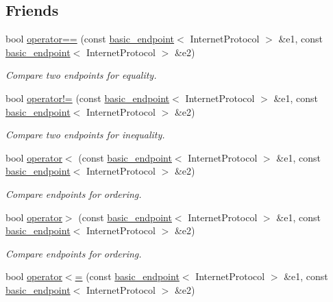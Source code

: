 \subsection*{Friends}
\begin{DoxyCompactItemize}
\item 
bool \hyperlink{classasio_1_1ip_1_1basic__endpoint_ac1430c7f3347469bf9693d0ad95d3bef}{operator==} (const \hyperlink{classasio_1_1ip_1_1basic__endpoint}{basic\+\_\+endpoint}$<$ Internet\+Protocol $>$ \&e1, const \hyperlink{classasio_1_1ip_1_1basic__endpoint}{basic\+\_\+endpoint}$<$ Internet\+Protocol $>$ \&e2)
\begin{DoxyCompactList}\small\item\em Compare two endpoints for equality. \end{DoxyCompactList}\item 
bool \hyperlink{classasio_1_1ip_1_1basic__endpoint_a5073cdcedcb2557a1c2cebba50672bb1}{operator!=} (const \hyperlink{classasio_1_1ip_1_1basic__endpoint}{basic\+\_\+endpoint}$<$ Internet\+Protocol $>$ \&e1, const \hyperlink{classasio_1_1ip_1_1basic__endpoint}{basic\+\_\+endpoint}$<$ Internet\+Protocol $>$ \&e2)
\begin{DoxyCompactList}\small\item\em Compare two endpoints for inequality. \end{DoxyCompactList}\item 
bool \hyperlink{classasio_1_1ip_1_1basic__endpoint_a244f754ee6c5338902d0825785298cf9}{operator$<$} (const \hyperlink{classasio_1_1ip_1_1basic__endpoint}{basic\+\_\+endpoint}$<$ Internet\+Protocol $>$ \&e1, const \hyperlink{classasio_1_1ip_1_1basic__endpoint}{basic\+\_\+endpoint}$<$ Internet\+Protocol $>$ \&e2)
\begin{DoxyCompactList}\small\item\em Compare endpoints for ordering. \end{DoxyCompactList}\item 
bool \hyperlink{classasio_1_1ip_1_1basic__endpoint_a4386f95d228ee98c40d8720288d1fa69}{operator$>$} (const \hyperlink{classasio_1_1ip_1_1basic__endpoint}{basic\+\_\+endpoint}$<$ Internet\+Protocol $>$ \&e1, const \hyperlink{classasio_1_1ip_1_1basic__endpoint}{basic\+\_\+endpoint}$<$ Internet\+Protocol $>$ \&e2)
\begin{DoxyCompactList}\small\item\em Compare endpoints for ordering. \end{DoxyCompactList}\item 
bool \hyperlink{classasio_1_1ip_1_1basic__endpoint_ae35ea668781acbf1f5a77881ca8c8a55}{operator$<$=} (const \hyperlink{classasio_1_1ip_1_1basic__endpoint}{basic\+\_\+endpoint}$<$ Internet\+Protocol $>$ \&e1, const \hyperlink{classasio_1_1ip_1_1basic__endpoint}{basic\+\_\+endpoint}$<$ Internet\+Protocol $>$ \&e2)

\end{DoxyCompactItemize}
